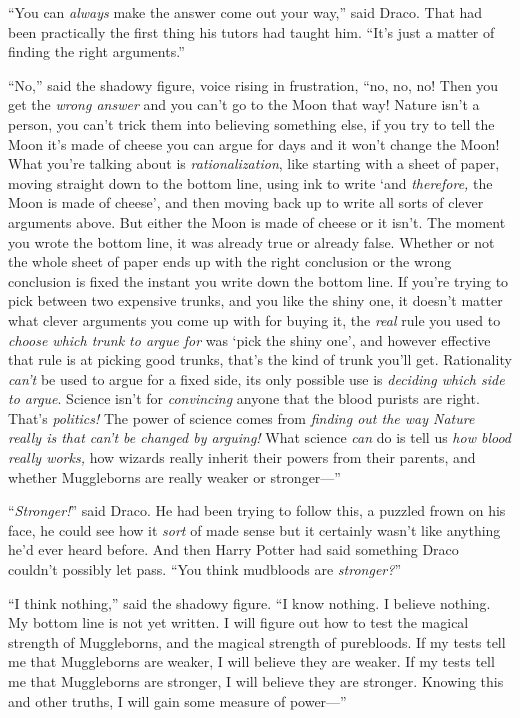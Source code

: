 “You can \emph{always} make the answer come out your way,” said Draco. That had
been practically the first thing his tutors had taught him. “It’s just a matter
of finding the right arguments.”

“No,” said the shadowy figure, voice rising in frustration, “no, no, no! Then
you get the \emph{wrong answer} and you can’t go to the Moon that way! Nature
isn’t a person, you can’t trick them into believing something else, if you try
to tell the Moon it’s made of cheese you can argue for days and it won’t change
the Moon! What you’re talking about is \emph{rationalization}, like starting
with a sheet of paper, moving straight down to the bottom line, using ink to
write ‘and \emph{therefore,} the Moon is made of cheese’, and then moving back
up to write all sorts of clever arguments above. But either the Moon is made of
cheese or it isn’t. The moment you wrote the bottom line, it was already true
or already false. Whether or not the whole sheet of paper ends up with the
right conclusion or the wrong conclusion is fixed the instant you write down
the bottom line. If you’re trying to pick between two expensive trunks, and you
like the shiny one, it doesn’t matter what clever arguments you come up with
for buying it, the \emph{real} rule you used to \emph{choose which trunk to
argue for} was ‘pick the shiny one’, and however effective that rule is at
picking good trunks, that’s the kind of trunk you’ll get. Rationality
\emph{can’t} be used to argue for a fixed side, its only possible use is
\emph{deciding which side to argue}. Science isn’t for \emph{convincing} anyone
that the blood purists are right. That’s \emph{politics!} The power of science
comes from \emph{finding out the way Nature really is that can’t be changed by
arguing!} What science \emph{can} do is tell us \emph{how blood really works,}
how wizards really inherit their powers from their parents, and whether
Muggleborns are really weaker or stronger—”

“\emph{Stronger!}” said Draco. He had been trying to follow this, a puzzled
frown on his face, he could see how it \emph{sort} of made sense but it
certainly wasn’t like anything he’d ever heard before. And then Harry Potter
had said something Draco couldn’t possibly let pass. “You think mudbloods are
\emph{stronger?}”

“I think nothing,” said the shadowy figure. “I know nothing. I believe nothing.
My bottom line is not yet written. I will figure out how to test the magical
strength of Muggleborns, and the magical strength of purebloods. If my tests
tell me that Muggleborns are weaker, I will believe they are weaker. If my
tests tell me that Muggleborns are stronger, I will believe they are stronger.
Knowing this and other truths, I will gain some measure of power—”

